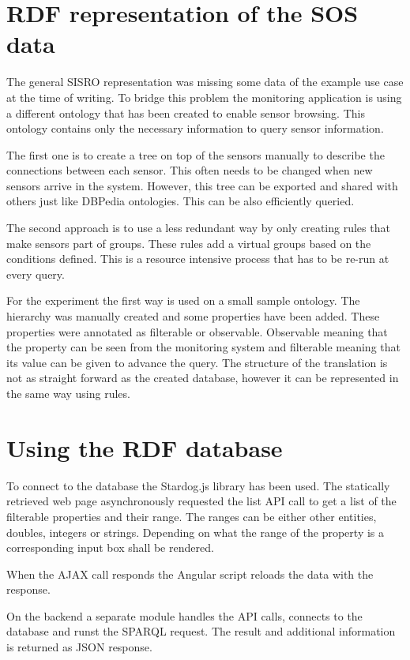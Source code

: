 \section{RDF representation of the SOS data}

The general SISRO representation was missing some data of the example use case at the time of writing. To bridge this problem the monitoring application is using a different ontology that has been created to enable sensor browsing. This ontology contains only the necessary information to query sensor information.

The first one is to create a tree on top of the sensors manually to describe the connections between each sensor. This often needs to be changed when new sensors arrive in the system. However, this tree can be exported and shared with others just like DBPedia ontologies. This can be also efficiently queried.

The second approach is to use a less redundant way by only creating rules that make sensors part of groups. These rules add a virtual groups based on the conditions defined. This is a resource intensive process that has to be re-run at every query. 

For the experiment the first way is used on a small sample ontology. The hierarchy was manually created and some properties have been added. These properties were annotated as filterable or observable. Observable meaning that the property can be seen from the monitoring system and filterable meaning that its value can be given to advance the query. The structure of the translation is not as straight forward as the created database, however it can be represented in the same way using rules. 
 
\section{Using the RDF database}

To connect to the database the Stardog.js library has been used. The statically retrieved web page asynchronously requested the list API call to get a list of the filterable properties and their range. The ranges can be either other entities, doubles, integers or strings. Depending on what the range of the property is a corresponding input box shall be rendered.

When the AJAX call responds the Angular script reloads the data with the response. 

On the backend a separate module handles the API calls, connects to the database and runst the SPARQL request. The result and additional information is returned as JSON response.

